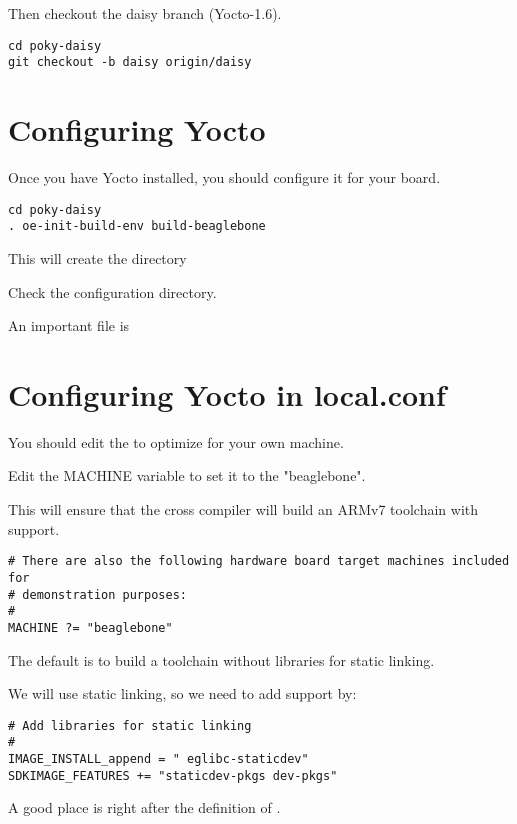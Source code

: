 Then checkout the daisy branch (Yocto-1.6).

\begin{verbatim}
cd poky-daisy
git checkout -b daisy origin/daisy
\end{verbatim}

\clearpage
\section{Configuring Yocto}

Once you have Yocto installed, you should configure it for your board.

\begin{verbatim}
cd poky-daisy
. oe-init-build-env	build-beaglebone
\end{verbatim}

This will create the  directory

Check the  configuration directory.

An important file is 

\section{Configuring Yocto in local.conf}

You should edit the  to optimize for your own machine.

Edit the MACHINE variable to set it to the "beaglebone".

This will ensure that the cross compiler will build an ARMv7 toolchain with  support.

\begin{verbatim}
# There are also the following hardware board target machines included for 
# demonstration purposes:
#
MACHINE ?= "beaglebone"
\end{verbatim}

The default is to build a toolchain without libraries for static linking.

We will use static linking, so we need to add support by:

\begin{verbatim}
# Add libraries for static linking
#
IMAGE_INSTALL_append = " eglibc-staticdev"
SDKIMAGE_FEATURES += "staticdev-pkgs dev-pkgs"
\end{verbatim}

A good place is right after the definition of .


